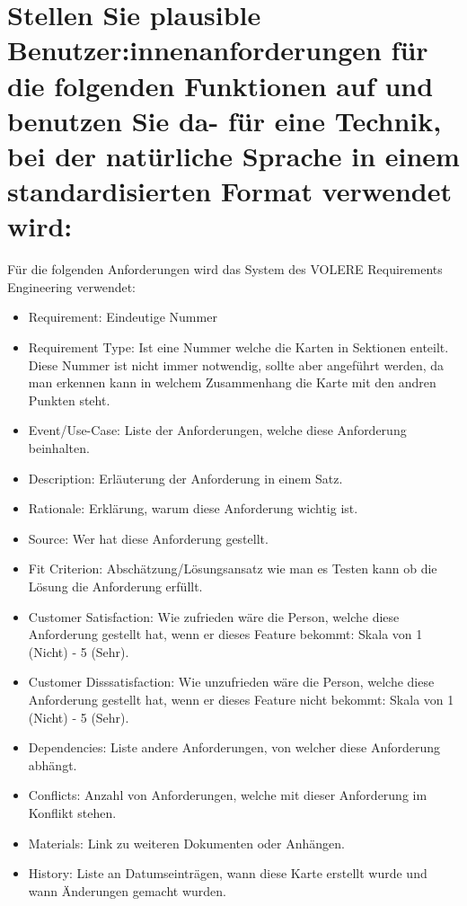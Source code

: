 \documentclass[12pt]{article}
\begin{document}
\section{Stellen Sie plausible Benutzer:innenanforderungen für die folgenden Funktionen auf und benutzen Sie da-
für eine Technik, bei der natürliche Sprache in einem standardisierten Format verwendet wird:}
Für die folgenden Anforderungen wird das System des VOLERE Requirements Engineering verwendet:
\begin{itemize}
 \item Requirement: Eindeutige Nummer
 \item Requirement Type: Ist eine Nummer welche die Karten in Sektionen enteilt. Diese Nummer ist nicht immer notwendig, sollte aber angeführt werden, da man erkennen kann in welchem Zusammenhang die Karte mit den andren Punkten steht.
 \item Event/Use-Case: Liste der Anforderungen, welche diese Anforderung beinhalten.
 \item Description: Erläuterung der Anforderung in einem Satz.
 \item Rationale: Erklärung, warum diese Anforderung wichtig ist.
 \item Source: Wer hat diese Anforderung gestellt.
 \item Fit Criterion: Abschätzung/Lösungsansatz wie man es Testen kann ob die Lösung die Anforderung erfüllt.
 \item Customer Satisfaction: Wie zufrieden wäre die Person, welche diese Anforderung gestellt hat, wenn er dieses Feature bekommt: Skala von 1 (Nicht) - 5 (Sehr).
 \item Customer Disssatisfaction: Wie unzufrieden wäre die Person, welche diese Anforderung gestellt hat, wenn er dieses Feature nicht bekommt: Skala von 1 (Nicht) - 5 (Sehr).
 \item Dependencies: Liste andere Anforderungen, von welcher diese Anforderung abhängt.
 \item Conflicts: Anzahl von Anforderungen, welche mit dieser Anforderung im Konflikt stehen.
 \item Materials: Link zu weiteren Dokumenten oder Anhängen.
 \item History: Liste an Datumseinträgen, wann diese Karte erstellt wurde und wann Änderungen gemacht wurden.
\end{itemize}
\cite{volere}
\pagebreak
\end{document}
